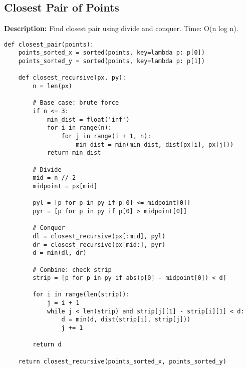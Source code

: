 \subsection{Closest Pair of Points}
\textbf{Description:} Find closest pair using divide and conquer. Time: O(n log n).

\begin{lstlisting}
def closest_pair(points):
    points_sorted_x = sorted(points, key=lambda p: p[0])
    points_sorted_y = sorted(points, key=lambda p: p[1])
    
    def closest_recursive(px, py):
        n = len(px)
        
        # Base case: brute force
        if n <= 3:
            min_dist = float('inf')
            for i in range(n):
                for j in range(i + 1, n):
                    min_dist = min(min_dist, dist(px[i], px[j]))
            return min_dist
        
        # Divide
        mid = n // 2
        midpoint = px[mid]
        
        pyl = [p for p in py if p[0] <= midpoint[0]]
        pyr = [p for p in py if p[0] > midpoint[0]]
        
        # Conquer
        dl = closest_recursive(px[:mid], pyl)
        dr = closest_recursive(px[mid:], pyr)
        d = min(dl, dr)
        
        # Combine: check strip
        strip = [p for p in py if abs(p[0] - midpoint[0]) < d]
        
        for i in range(len(strip)):
            j = i + 1
            while j < len(strip) and strip[j][1] - strip[i][1] < d:
                d = min(d, dist(strip[i], strip[j]))
                j += 1
        
        return d
    
    return closest_recursive(points_sorted_x, points_sorted_y)
\end{lstlisting}
